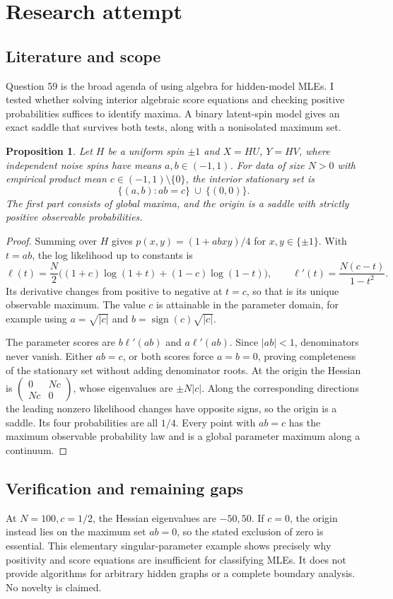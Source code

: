 \documentclass[11pt]{article}
\newtheorem{proposition}{Proposition}
\begin{document}
\section{Research attempt}
\subsection{Literature and scope}
Question 59 is the broad agenda of using algebra for hidden-model MLEs. I tested whether solving interior algebraic score equations and checking positive probabilities suffices to identify maxima. A binary latent-spin model gives an exact saddle that survives both tests, along with a nonisolated maximum set.
\begin{proposition}
Let $H$ be a uniform spin $\pm1$ and $X=HU$, $Y=HV$, where independent noise spins have means $a,b\in(-1,1)$. For data of size $N>0$ with empirical product mean $c\in(-1,1)\setminus\{0\}$, the interior stationary set is
\[
\{(a,b):ab=c\}\ \cup\ \{(0,0)\}.
\]
The first part consists of global maxima, and the origin is a saddle with strictly positive observable probabilities.
\end{proposition}
\begin{proof}
Summing over $H$ gives $p(x,y)=(1+abxy)/4$ for $x,y\in\{\pm1\}$. With $t=ab$, the log likelihood up to constants is
\[
\ell(t)=\frac N2\bigl((1+c)\log(1+t)+(1-c)\log(1-t)\bigr),
\qquad \ell'(t)=\frac{N(c-t)}{1-t^2}.
\]
Its derivative changes from positive to negative at $t=c$, so that is its unique observable maximum. The value $c$ is attainable in the parameter domain, for example using $a=\sqrt{|c|}$ and $b=\operatorname{sign}(c)\sqrt{|c|}$.

The parameter scores are $b\ell'(ab)$ and $a\ell'(ab)$. Since $|ab|<1$, denominators never vanish. Either $ab=c$, or both scores force $a=b=0$, proving completeness of the stationary set without adding denominator roots. At the origin the Hessian is $\left(\begin{smallmatrix}0&Nc\\Nc&0\end{smallmatrix}\right)$, whose eigenvalues are $\pm N|c|$. Along the corresponding directions the leading nonzero likelihood changes have opposite signs, so the origin is a saddle. Its four probabilities are all $1/4$. Every point with $ab=c$ has the maximum observable probability law and is a global parameter maximum along a continuum.
\end{proof}
\subsection{Verification and remaining gaps}
At $N=100,c=1/2$, the Hessian eigenvalues are $-50,50$. If $c=0$, the origin instead lies on the maximum set $ab=0$, so the stated exclusion of zero is essential. This elementary singular-parameter example shows precisely why positivity and score equations are insufficient for classifying MLEs. It does not provide algorithms for arbitrary hidden graphs or a complete boundary analysis. No novelty is claimed.
\end{document}

